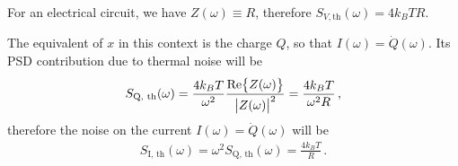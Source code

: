 \documentclass[main.tex]{subfiles}
\begin{document}
For an electrical circuit, we have \(Z(\omega ) \equiv R\), therefore \(S_{V, \text{th}} (\omega ) = 4 k_B T R\). 

The equivalent of \(x\) in this context is the charge \(Q\), so that \(I(\omega ) = \dot{Q}(\omega )\). Its PSD contribution due to thermal noise will be 
%
\begin{align}
S _{\text{Q, th}} (\omega ) = \frac{4 k_B T}{\omega^2} \frac{\Re{Z(\omega )}}{\abs{Z(\omega )}^2} = \frac{4 k_B T}{\omega^2 R}
\,,
\end{align}
%
therefore the noise on the current \(I(\omega ) = \dot{Q} (\omega )\) will be 
%
\begin{align}
S _{\text{I, th}} (\omega ) = \omega^2 S _{\text{Q, th}} (\omega ) = \frac{4 k_B T}{R}
\,.
\end{align}





\end{document}
